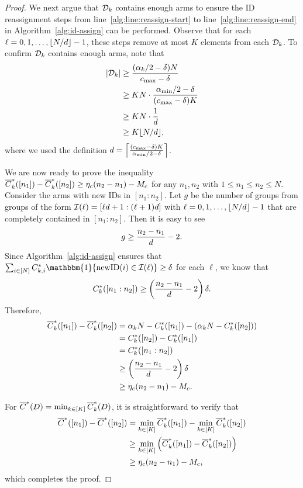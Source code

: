 \begin{proof}
We next argue that $\mathcal{D}_k$ contains enough arms to ensure the ID reassignment steps from line~\ref{alg:line:reassign-start} to line~\ref{alg:line:reassign-end} in Algorithm~\ref{alg:id-assign} can be performed.
Observe that for each $\ell = 0,1,\dots,\lfloor N/ d\rfloor -1$, these steps remove at most $K$ elements from each $\mathcal{D}_k$.
To confirm $\mathcal{D}_k$ contains enough arms, note that
\begin{align*}
    \left\lvert\mathcal{D}_k\right\rvert&\geq \frac{(\alpha_k/2-\delta)N}{c_{\max}-\delta}\\
    &\ge KN\cdot \frac{\alpha_{\min}/2-\delta}{(c_{\max}-\delta)K}\\
    &\ge KN\cdot\frac{1}{d}\\
    &\ge K\lfloor N/d\rfloor,
\end{align*}
where we used the definition $d = \left\lceil \frac{(c_{\max}-\delta)K}{\alpha_{\min}/2-\delta}\right\rceil$.


We are now ready to prove the inequality $\overline{C}^*_k([n_1])-\overline{C}^*_k([n_2])\ge \eta_c(n_2-n_1)-M_c$ for any $n_1,n_2$ with $1\le n_1\le n_2\le N$.
Consider the arms with new IDs in $[n_1:n_2]$.
Let $g$ be the number of groups from groups of the form $\mathcal{I}(\ell)=[\ell d+1:(\ell+1)d]$ with $\ell=0,1,\dots,\lfloor N/d\rfloor -1$ that are completely contained in $[n_1:n_2]$.
Then it is easy to see
\begin{equation*}
    g \ge \frac{n_2-n_1}{d}-2.
\end{equation*}
Since Algorithm~\ref{alg:id-assign} ensures that $\sum_{i\in[N]}C_{k,i}^*\mathbbm{1}\{\newID(i)\in \cI(\ell)\}\ge \costIDreassign$ for each $\ell$, we know that
\begin{equation*}
    C_k^*([n_1:n_2])\ge \left(\frac{n_2-n_1}{d}-2\right)\delta.
\end{equation*}
Therefore,
\begin{align*}
    \overline{C}^*_k([n_1])-\overline{C}^*_k([n_2]) & = \alpha_k N-C_k^*([n_1])-(\alpha_k N-C_k^*([n_2]))\\
    &=C_k^*([n_2])-C_k^*([n_1])\\
    &=C_k^*([n_1:n_2])\\
    &\ge \left(\frac{n_2-n_1}{d}-2\right)\delta\\
    &\ge \eta_c(n_2-n_1)-M_c.
\end{align*}

For $\overline{C}^*(D)=\min_{k\in[K]}\overline{C}^*_k(D)$, it is straightforward to verify that
\begin{align*}
    \overline{C}^*([n_1])-\overline{C}^*([n_2]) &= \min_{k\in[K]}\overline{C}^*_k([n_1]) - \min_{k\in[K]}\overline{C}^*_k([n_2])\\
    &\ge \min_{k\in[K]}\left(\overline{C}^*_k([n_1]) - \overline{C}^*_k([n_2])\right)\\
    &\ge \eta_c(n_2-n_1)-M_c,
\end{align*}
which completes the proof.
\end{proof}





